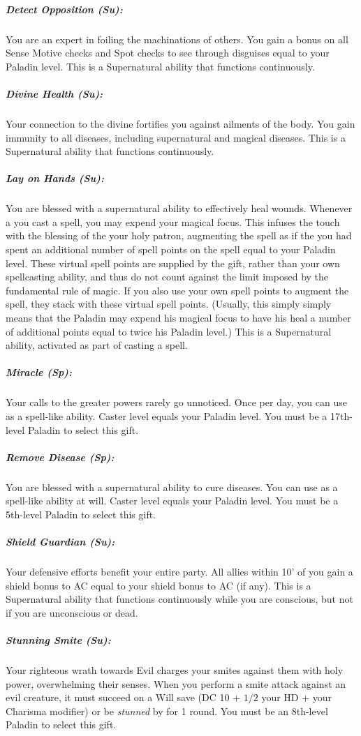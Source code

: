 \subparagraph{Detect Opposition (Su):}
You are an expert in foiling the machinations of others. 
You gain a bonus on all Sense Motive checks and Spot checks to see through disguises equal to your Paladin level.
This is a Supernatural ability that functions continuously.

\subparagraph{Divine Health (Su):}
Your connection to the divine fortifies you against ailments of the body. You gain immunity to all diseases, including supernatural and magical diseases. This is a Supernatural ability that functions continuously.

\subparagraph{Lay on Hands (Su):}
You are blessed with a supernatural ability to effectively heal wounds. Whenever a you cast a  spell, you may expend your magical focus.
This infuses the touch with the blessing of the your holy patron, augmenting the spell as if the you had spent
an additional number of spell points on the spell equal to your Paladin level. 
These virtual spell points are supplied by the gift, rather than your own spellcasting ability, 
and thus do not count against the limit imposed by the fundamental rule of magic. 
If you also use your own spell points to augment the spell, they stack with these virtual spell points.
(Usually, this simply simply means that the Paladin may expend 
his magical focus to have his  heal a number of additional points equal to twice his Paladin level.)
This is a Supernatural ability, activated as part of casting a  spell.

\subparagraph{Miracle (Sp):}
Your calls to the greater powers rarely go unnoticed. Once per day, you can use  as a spell-like ability. Caster level equals your Paladin level.
You must be a 17th-level Paladin to select this gift.

\subparagraph{Remove Disease (Sp):}
You are blessed with a supernatural ability to cure diseases. You can use  as a spell-like ability at will. Caster level equals your Paladin level.
You must be a 5th-level Paladin to select this gift.

\subparagraph{Shield Guardian (Su):}
Your defensive efforts benefit your entire party. All allies within 10' of you gain a shield bonus to AC equal to your shield bonus to AC (if any).
This is a Supernatural ability that functions continuously while you are conscious, but not if you are unconscious or dead.

\subparagraph{Stunning Smite (Su):}
Your righteous wrath towards Evil charges your smites against them with holy power, overwhelming their senses.
When you perform a smite attack against an evil creature, it must succeed on a Will save (DC 10 + $1/2$ your HD + your Charisma modifier) or be \emph{stunned} by for 1 round. You must be an 8th-level Paladin to select this gift.

